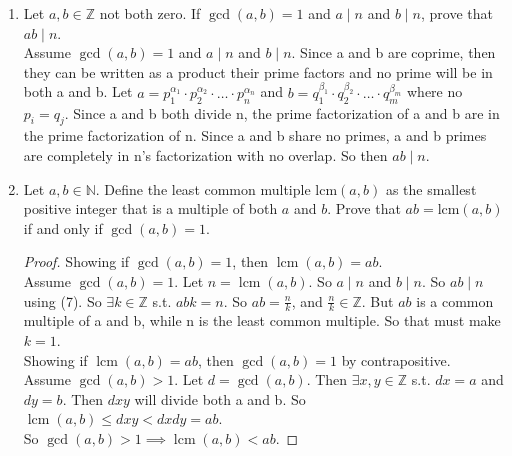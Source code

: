 \documentclass[12pt]{article}
\newcommand{\Z}{\mathbb{Z}}
\DeclareMathOperator{\lcm}{lcm}
\begin{document}
\begin{enumerate}
\medskip
\item Let $a,b \in \mathbb{Z}$ not both zero.  If $\gcd(a,b) = 1$ and $a \mid n$ and $b \mid n$, prove that $ab \mid n$.\medskip\\
Assume $\gcd(a,b) = 1$ and $a \mid n$ and $b \mid n$. Since a and b are coprime, then they can be written as a product their prime factors and no prime will be in both a and b. Let $a=p_1^{\alpha_1}\cdot p_2^{\alpha_2}\cdot\ldots\cdot p_n^{\alpha_n}$ and $b=q_1^{\beta_1}\cdot q_2^{\beta_2}\cdot\ldots\cdot q_m^{\beta_m}$ where no $p_i=q_j$. Since a and b both divide n, the prime factorization of a and b are in the prime factorization of n. Since a and b share no primes, a and b primes are completely in n's factorization with no overlap. So then $ab \mid n$.

\medskip
\item Let $a,b \in \mathbb{N}$.  Define the least common multiple $\mathrm{lcm}(a,b)$ as the smallest positive integer that is a multiple of both $a$ and $b$.  Prove that $ab = \mathrm{lcm}(a,b)$ if and only if $\gcd(a,b) = 1$.
\begin{proof}
	Showing if $\gcd(a,b)=1$, then $\lcm(a,b)=ab$.\\
	Assume $\gcd(a,b)=1$. Let $n=\lcm(a,b)$. So $a\mid n$ and $b\mid n$. So $ab\mid n$ using (7). So $\exists k\in\Z$ s.t. $abk=n$. So $ab=\frac{n}{k}$, and $\frac{n}{k}\in\Z$. But $ab$ is a common multiple of a and b, while n is the least common multiple. So that must make $k=1$.\medskip\\
	Showing if $\lcm(a,b)=ab$, then $\gcd(a,b)=1$ by contrapositive.\\
	Assume $\gcd(a,b)>1$. Let $d=\gcd(a,b)$. Then $\exists x,y\in\Z$ s.t. $dx=a$ and $dy=b$. Then $dxy$ will divide both a and b. So $\lcm(a,b)\leq dxy < dxdy = ab$. \\So $\gcd(a,b)>1 \implies \lcm(a,b)<ab$.
\end{proof}


\end{enumerate}
\end{document}
